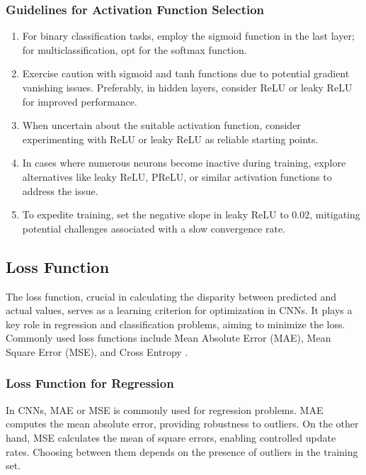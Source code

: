 \subsubsection{Guidelines for Activation Function Selection}

\begin{enumerate}
	\item For binary classification tasks, employ the sigmoid function in the last layer; for multiclassification, opt for the softmax function.
	\item Exercise caution with sigmoid and tanh functions due to potential gradient vanishing issues. Preferably, in hidden layers, consider ReLU or leaky ReLU for improved performance.
	\item When uncertain about the suitable activation function, consider experimenting with ReLU or leaky ReLU as reliable starting points.
	\item In cases where numerous neurons become inactive during training, explore alternatives like leaky ReLU, PReLU, or similar activation functions to address the issue.
	\item To expedite training, set the negative slope in leaky ReLU to 0.02, mitigating potential challenges associated with a slow convergence rate.
\end{enumerate}


\subsection{Loss Function}
\label{subsection:LossFunction}

The loss function, crucial in calculating the disparity between predicted and actual values, serves as a learning criterion for optimization in CNNs. It plays a key role in regression and classification problems, aiming to minimize the loss. Commonly used loss functions include Mean Absolute Error (MAE), Mean Square Error (MSE), and Cross Entropy \cite{Li:2021}.

\subsubsection{Loss Function for Regression}
In CNNs, MAE or MSE is commonly used for regression problems. MAE computes the mean absolute error, providing robustness to outliers. On the other hand, MSE calculates the mean of square errors, enabling controlled update rates. Choosing between them depends on the presence of outliers in the training set.

